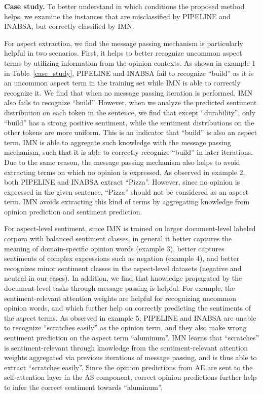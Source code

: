 \documentclass[11pt,a4paper]{article}
\begin{document}
\noindent\textbf{Case study.}
To better understand in which conditions the proposed method helps, we examine the instances that are misclassified by PIPELINE and INABSA, but correctly classified by IMN. 

For aspect extraction, we find the message passing mechanism is particularly helpful in two scenarios. First, it helps to better recognize uncommon aspect terms by utilizing information from the opinion contexts. As shown in example 1 in Table~\ref{case_study}, PIPELINE and INABSA fail to recognize ``build'' as it is an uncommon aspect term in the training set while IMN is able to correctly recognize it. We find that when no message passing iteration is performed, IMN also fails to recognize ``build''. However, when we analyze the predicted sentiment distribution on each token in the sentence, we find that except ``durability'', only ``build'' has a strong positive sentiment, while the sentiment distributions on the other tokens are more uniform. This is an indicator that ``build'' is also an aspect term. IMN is able to aggregate such knowledge with the message passing mechanism, such that it is able to correctly recognize ``build'' in later iterations. 
Due to the same reason, the message passing mechanism also helps to avoid extracting terms on which no opinion is expressed. As observed in example 2, both PIPELINE and INABSA extract ``Pizza''. However, since no opinion is expressed in the given sentence, ``Pizza'' should not be considered as an aspect term. IMN avoids extracting this kind of terms by aggregating knowledge from opinion prediction and sentiment prediction. 

For aspect-level sentiment, since IMN is trained on larger document-level labeled corpora with balanced sentiment classes, in general it better captures the meaning of domain-specific opinion words (example 3), better captures sentiments of complex expressions such as negation (example 4), and better recognizes minor sentiment classes in the aspect-level datasets (negative and neutral in our cases). In addition, we find that knowledge propagated by the document-level tasks through message passing is helpful.  
For example, the sentiment-relevant attention weights are helpful for recognizing uncommon opinion words, and which further help on correctly predicting the sentiments of the aspect terms. 
As observed in example 5, PIPELINE and INABSA are unable to recognize ``scratches easily'' as the opinion term, and they also make wrong sentiment prediction on the aspect term ``aluminum''. IMN learns that ``scratches'' is sentiment-relevant through knowledge from the sentiment-relevant attention weights aggregated via previous iterations of message passing, and is thus able to extract ``scratches easily''. Since the opinion predictions from AE are sent to the self-attention layer in the AS component, correct opinion predictions further help to infer the correct sentiment towards ``aluminum''.
\end{document}
